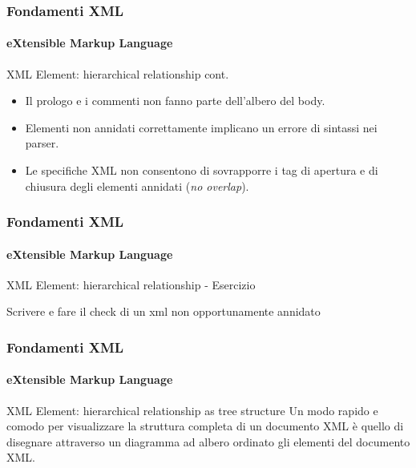 \begin{frame}
    \frametitle{Fondamenti XML}
    \framesubtitle{eXtensible Markup Language}
    \addtocounter{nframe}{1}

	\begin{block}{XML Element: hierarchical relationship cont.}
		\begin{itemize}
			\item Il prologo e i commenti non fanno parte dell'albero del body.
			\item Elementi non annidati correttamente implicano un errore di sintassi nei parser.
			\item Le specifiche XML non consentono di sovrapporre i tag di apertura e di chiusura degli elementi annidati (\textit{no overlap}).
		\end{itemize}
	\end{block}

\end{frame}


\begin{frame}
    \frametitle{Fondamenti XML}
    \framesubtitle{eXtensible Markup Language}
    \addtocounter{nframe}{1}

	\begin{block}{XML Element: hierarchical relationship - Esercizio}
		\begin{center}
			Scrivere e fare il check di un xml non opportunamente annidato
		\end{center}
	\end{block}

\end{frame}


\begin{frame}
    \frametitle{Fondamenti XML}
    \framesubtitle{eXtensible Markup Language}
    \addtocounter{nframe}{1}

	\begin{block}{XML Element: hierarchical relationship as tree structure}
		Un modo rapido e comodo per visualizzare la struttura completa di un documento XML è quello di disegnare attraverso un diagramma ad albero ordinato gli elementi del documento XML.
	\end{block}

\end{frame}

